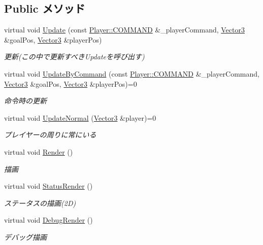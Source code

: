 \subsection*{Public メソッド}
\begin{DoxyCompactItemize}
\item 
virtual void \hyperlink{class_ally_base_ad0e5ffbd4082605a9db1f81f8a4724bc}{Update} (const \hyperlink{class_player_a70057174eaea9fd441ca86cc7bb896ed}{Player\-::\-C\-O\-M\-M\-A\-N\-D} \&\-\_\-player\-Command, \hyperlink{struct_vector3}{Vector3} \&goal\-Pos, \hyperlink{struct_vector3}{Vector3} \&player\-Pos)
\begin{DoxyCompactList}\small\item\em 更新(この中で更新すべき\-Updateを呼び出す) \end{DoxyCompactList}\item 
virtual void \hyperlink{class_ally_base_a96371430d8037793f7bd4b3a75d8c136}{Update\-By\-Command} (const \hyperlink{class_player_a70057174eaea9fd441ca86cc7bb896ed}{Player\-::\-C\-O\-M\-M\-A\-N\-D} \&\-\_\-player\-Command, \hyperlink{struct_vector3}{Vector3} \&goal\-Pos, \hyperlink{struct_vector3}{Vector3} \&player\-Pos)=0
\begin{DoxyCompactList}\small\item\em 命令時の更新 \end{DoxyCompactList}\item 
virtual void \hyperlink{class_ally_base_a7ab6832753de076894761ce58389ef7c}{Update\-Normal} (\hyperlink{struct_vector3}{Vector3} \&player)=0
\begin{DoxyCompactList}\small\item\em プレイヤーの周りに常にいる \end{DoxyCompactList}\item 
virtual void \hyperlink{class_ally_base_aadfd770043d90b11986181a75ad2e32d}{Render} ()
\begin{DoxyCompactList}\small\item\em 描画 \end{DoxyCompactList}\item 
virtual void \hyperlink{class_ally_base_a273efbd74be3780208b5c70cd80a1111}{Status\-Render} ()
\begin{DoxyCompactList}\small\item\em ステータスの描画(2\-D) \end{DoxyCompactList}\item 
virtual void \hyperlink{class_ally_base_a76b3e01b0d3ad523947f5c1d480c211e}{Debug\-Render} ()
\begin{DoxyCompactList}\small\item\em デバッグ描画 \end{DoxyCompactList}\item 

\end{DoxyCompactItemize}
